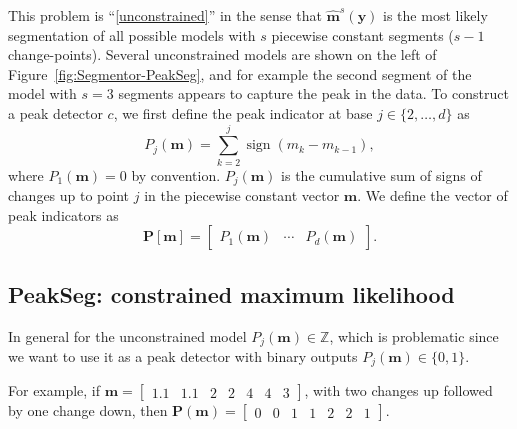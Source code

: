 \documentclass{article}
\DeclareMathOperator*{\sign}{sign}
\newcommand{\ZZ}{\mathbb Z}
\begin{document}
This problem is ``\ref{unconstrained}'' in the sense that
$\mathbf{\hat m}^s(\mathbf y)$ is the most likely segmentation of all
possible models with $s$ piecewise constant segments ($s-1$
change-points). Several unconstrained models are shown on the left of
Figure~\ref{fig:Segmentor-PeakSeg}, and for example the second segment of the
model with $s=3$ segments appears to capture the peak in the data.
To construct a peak detector $c$, we first define the peak indicator at base
$j\in\{2, \dots, d\}$ as
\begin{equation}
  \label{eq:peaks}
  P_j(\mathbf m) = \sum_{k=2}^j \sign( m_{k} - m_{k-1} ),
\end{equation}
where $P_1(\mathbf m)=0$ by convention. $P_j(\mathbf m)$ is the
cumulative sum of signs of changes up to point $j$ in the piecewise
constant vector $\mathbf m$. We define the vector of peak indicators
as
\begin{equation}
  \mathbf
P[\mathbf m] = \left[\begin{array}{ccc} P_1(\mathbf m) & \cdots &
    P_d(\mathbf m)
\end{array}\right].
\end{equation}

\subsection{PeakSeg: constrained maximum likelihood}
\label{sec:constrained}

In general for the unconstrained model $P_j(\mathbf m)\in\ZZ$, which
is problematic since we want to use it as a peak detector with binary
outputs $P_j(\mathbf m)\in \{0, 1\}$. 

For example, if $\mathbf m = \left[\begin{array}{ccccccc}1.1 &
    1.1 & 2 & 2 & 4 & 4 & 3\end{array}\right]$, with two changes up
followed by one change down, then $\mathbf P(\mathbf m) =
\left[\begin{array}{ccccccc}0 & 0 & 1 & 1 & 2 & 2 &
    1 \end{array}\right]$.

\end{document}
